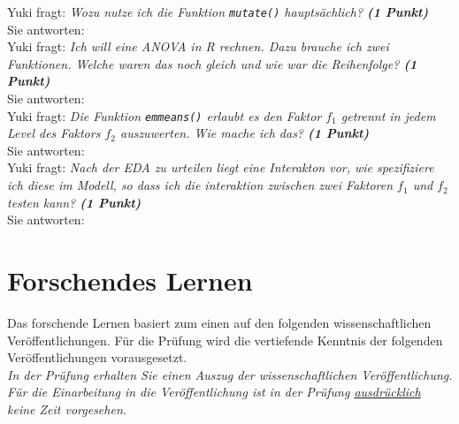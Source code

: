 \documentclass[a4paper, 9pt]{scrartcl}\usepackage[]{graphicx}\usepackage[]{xcolor}
\begin{document}
Yuki fragt: \textit{Wozu nutze ich die Funktion \texttt{mutate()} hauptsächlich? \textbf{(1 Punkt)}}\\[1ex]
Sie antworten:\\[2Ex]

Yuki fragt: \textit{Ich will eine ANOVA in R rechnen. Dazu brauche ich zwei Funktionen. Welche waren das noch gleich und wie war die Reihenfolge? \textbf{(1 Punkt)}}\\[1ex]
Sie antworten:\\[2Ex]

Yuki fragt: \textit{Die Funktion \texttt{emmeans()} erlaubt es den Faktor $f_1$ getrennt in jedem Level des Faktors $f_2$ auszuwerten. Wie mache ich das? \textbf{(1 Punkt)}}\\[1ex]
Sie antworten:\\[2Ex]

Yuki fragt: \textit{Nach der EDA zu urteilen liegt eine Interakton vor, wie spezifiziere ich diese im Modell, so dass ich die interaktion zwischen zwei Faktoren $f_1$ und $f_2$ testen kann? \textbf{(1 Punkt)}}\\[1ex]
Sie antworten:\\[2Ex]



 
\clearpage
\part{Forschendes Lernen}

Das forschende Lernen basiert zum einen auf den folgenden wissenschaftlichen Veröffentlichungen. Für die Prüfung wird die vertiefende Kenntnis der folgenden Veröffentlichungen vorausgesetzt.\\

\textit{In der Prüfung erhalten Sie einen Auszug der wissenschaftlichen Veröffentlichung. Für die Einarbeitung in die Veröffentlichung ist in der Prüfung \underline{ausdrücklich} keine Zeit vorgesehen.}
\end{document}

